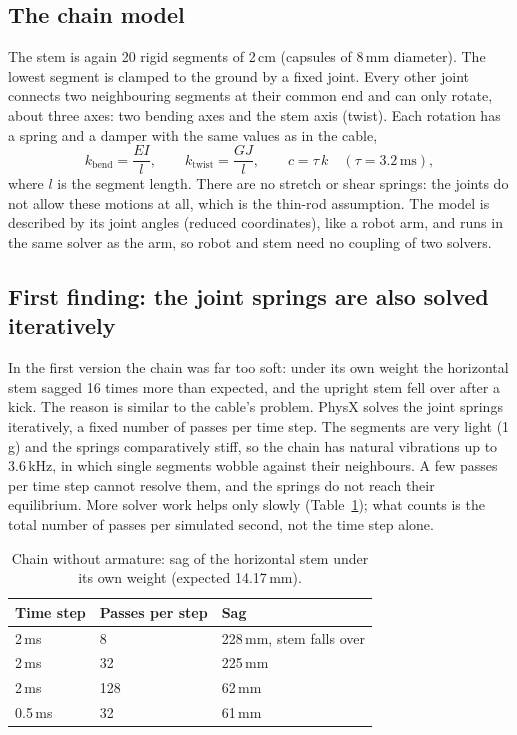 \subsection{The chain model}

The stem is again 20 rigid segments of 2\,cm (capsules of 8\,mm diameter). The lowest segment is clamped to
the ground by a fixed joint. Every other joint connects two neighbouring segments at their common end and can
only rotate, about three axes: two bending axes and the stem axis (twist). Each rotation has a spring and a
damper with the same values as in the cable,
\begin{equation*}
  k_\text{bend} = \frac{EI}{l}, \qquad k_\text{twist} = \frac{GJ}{l}, \qquad
  c = \tau\, k \quad (\tau = 3.2\,\text{ms}),
\end{equation*}
where $l$ is the segment length. There are no stretch or shear springs: the joints do not allow these motions
at all, which is the thin-rod assumption. The model is described by its joint angles (reduced coordinates),
like a robot arm, and runs in the same solver as the arm, so robot and stem need no coupling of two solvers.

\subsection{First finding: the joint springs are also solved iteratively}

In the first version the chain was far too soft: under its own weight the horizontal stem sagged 16 times more
than expected, and the upright stem fell over after a kick. The reason is similar to the cable's problem. PhysX
solves the joint springs iteratively, a fixed number of passes per time step. The segments are very light
(1\,g) and the springs comparatively stiff, so the chain has natural vibrations up to 3.6\,kHz, in which single
segments wobble against their neighbours. A few passes per time step cannot resolve them, and the springs do
not reach their equilibrium. More solver work helps only slowly (Table~\ref{tab:chain-iterations}); what counts
is the total number of passes per simulated second, not the time step alone.

\begin{table}[h]
  \centering
  \caption{Chain without armature: sag of the horizontal stem under its own weight (expected 14.17\,mm).}
  \label{tab:chain-iterations}
  \begin{tabular}{lll}
    \toprule
    Time step & Passes per step & Sag \\
    \midrule
    2\,ms   & 8   & 228\,mm, stem falls over \\
    2\,ms   & 32  & 225\,mm \\
    2\,ms   & 128 & 62\,mm \\
    0.5\,ms & 32  & 61\,mm \\
    \bottomrule
  \end{tabular}
\end{table}

